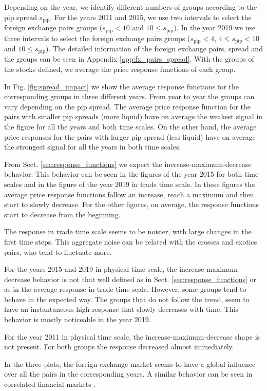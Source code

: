 Depending on the year, we identify different numbers of groups according to the pip spread $s_{\textrm{pip}}$. For the years 2011 and 2015, we use two
intervals to select the foreign exchange pairs groups ($s_{\textrm{pip}}<10$
and $10 \le s_{\textrm{pip}}$). In the year 2019 we use three intervals to
select the foreign exchange pairs groups ($s_{\textrm{pip}}<4$,
$4 \le s_{\textrm{pip}} < 10$ and $10 \le s_{\textrm{pip}}$). The detailed
information of the foreign exchange pairs, spread and the groups can be seen in
Appendix \ref{app:fx_pairs_spread}. With the groups of the stocks defined, we
average the price response functions of each group.

In Fig. \ref{fig:spread_impact} we show the average response functions for
the corresponding groups in three different years. From year to year the groups
can vary depending on the pip spread. The average price response function for
the pairs with smaller pip spreads (more liquid) have on average the weakest
signal in the figure for all the years and both time scales. On the other hand,
the average price responses for the pairs with larger pip spread (less liquid)
have on average the strongest signal for all the years in both time scales.

From Sect. \ref{sec:response_functions} we expect the increase-maximum-decrease
behavior. This behavior can be seen in the figures of the year 2015 for both
time scales and in the figure of the year 2019 in trade time scale. In these
figures the average price response functions follow an increase, reach a
maximum and then start to slowly decrease. For the other figures, on average,
the response functions start to decrease from the beginning.

The response in trade time scale seems to be noisier, with large changes in the
first time steps. This aggregate noise can be related with the crosses and
exotics pairs, who tend to fluctuate more.

For the years 2015 and 2019 in physical time scale, the
increase-maximum-decrease behavior is not that well defined as in Sect.
\ref{sec:response_functions} or as in the average response in trade time scale.
However, some groups tend to behave in the expected way. The groups that do not
follow the trend, seem to have an instantaneous high response that slowly
decreases with time. This behavior is mostly noticeable in the year 2019.

For the year 2011 in physical time scale, the increase-maximum-decrease shape
is not present. For both groups the response decreased almost immediately.

In the three plots, the foreign exchange market seems to have a global
influence over all the pairs in the corresponding years. A similar behavior
can be seen in correlated financial markets
\cite{my_paper_response_financial}.